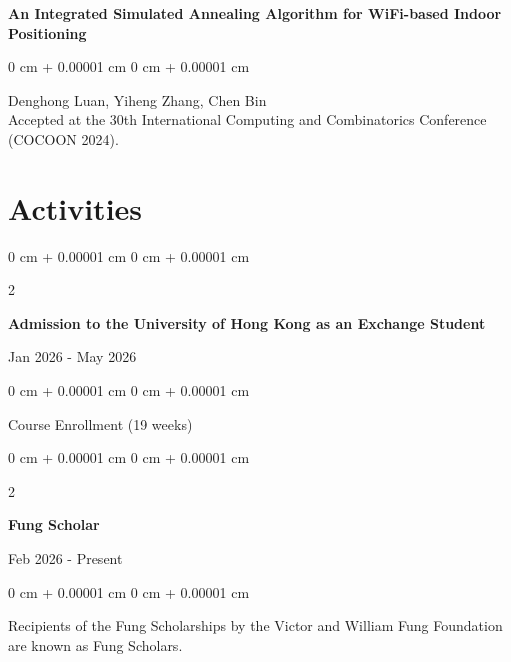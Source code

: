 \documentclass[10pt, letterpaper]{article}
\newenvironment{highlights}{
    \begin{itemize}[
        topsep=0.10 cm,
        parsep=0.10 cm,
        partopsep=0pt,
        itemsep=0pt,
        leftmargin=0 cm + 10pt
    ]
}{
    \end{itemize}
} %
\newenvironment{onecolentry}{
    \begin{adjustwidth}{
        0 cm + 0.00001 cm
    }{
        0 cm + 0.00001 cm
    }
}{
    \end{adjustwidth}
} %
\newenvironment{twocolentry}[2][]{
    \onecolentry
    \def\secondColumn{#2}
    \setcolumnwidth{\fill, 4.5 cm}
    \begin{paracol}{2}
}{
    \switchcolumn \raggedleft \secondColumn
    \end{paracol}
    \endonecolentry
} %
\begin{document}
\textbf{An Integrated Simulated Annealing Algorithm for WiFi-based Indoor Positioning}
\vspace{0.10 cm}
\begin{onecolentry}
Denghong Luan, Yiheng Zhang, Chen Bin\\
Accepted at the 30th International Computing and Combinatorics Conference (COCOON 2024).
\end{onecolentry}




    \section{Activities}
        \begin{samepage}
          \begin{twocolentry}{
          Jan 2026 - May 2026
          }
                \textbf{Admission to the University of Hong Kong as an Exchange Student }
                
\end{twocolentry}
            \vspace{0.10 cm}
            
            \begin{onecolentry}
      Course Enrollment (19 weeks)
        \end{onecolentry}
        \end{samepage}


 \begin{samepage}
          \begin{twocolentry}{
          Feb 2026 - Present
          }
                \textbf{Fung Scholar}
                
\end{twocolentry}
            \vspace{0.10 cm}
            
            \begin{onecolentry}
      Recipients of the Fung Scholarships by the Victor and William Fung Foundation are known as Fung Scholars.
        \end{onecolentry}
        \end{samepage}
\end{document}
